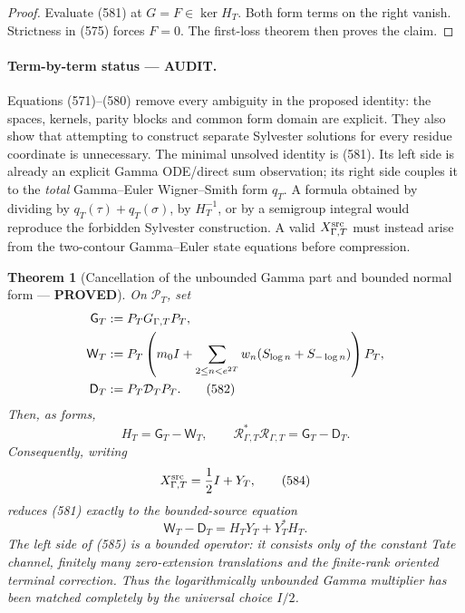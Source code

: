 \documentclass[11pt]{article}
\newtheorem{theorem}{Theorem}
\newcommand{\PROVED}{\textcolor{green!45!black}{\textbf{PROVED}}}
\newcommand{\AUDIT}{\textcolor{orange!75!black}{\textbf{AUDIT}}}
\begin{document}
\begin{proof}
Evaluate (581) at \(G=F\in\ker H_T\).  Both form terms on the right vanish.
Strictness in (575) forces \(F=0\).  The first-loss theorem then proves the
claim.
\end{proof}

\paragraph{Term-by-term status --- \AUDIT.}
Equations (571)--(580) remove every ambiguity in the proposed identity:
the spaces, kernels, parity blocks and common form domain are explicit.
They also show that attempting to construct separate Sylvester solutions
for every residue coordinate is unnecessary.  The minimal unsolved
identity is (581).  Its left side is already an explicit Gamma ODE/direct
sum observation; its right side couples it to the \emph{total}
Gamma--Euler Wigner--Smith form \(q_T\).  A formula obtained by dividing by
\(q_T(\tau)+q_T(\sigma)\), by \(H_T^{-1}\), or by a semigroup integral
would reproduce the forbidden Sylvester construction.  A valid
\(X_{\Gamma,T}^{\rm src}\) must instead arise from the two-contour
Gamma--Euler state equations before compression.

\begin{theorem}[Cancellation of the unbounded Gamma part and bounded normal
form --- \PROVED]
On \(\mathcal P_T\), set
\begin{align}
 \mathsf G_T&:=P_TG_{\Gamma,T}P_T,\notag\\
 \mathsf W_T&:=P_T\left(m_0I+
   \sum_{2\le n<e^{2T}}w_n(S_{\log n}+S_{-\log n})\right)P_T,\notag\\
 \mathsf D_T&:=P_T\mathcal D_TP_T.                   \tag{582}
\end{align}
Then, as forms,
\begin{equation}
 H_T=\mathsf G_T-\mathsf W_T,\qquad
 \mathcal R_{\Gamma,T}^*\mathcal R_{\Gamma,T}
 =\mathsf G_T-\mathsf D_T.                           \tag{583}
\end{equation}
Consequently, writing
\begin{equation}
 X_{\Gamma,T}^{\rm src}=\frac12I+Y_T,                \tag{584}
\end{equation}
reduces (581) exactly to the bounded-source equation
\begin{equation}
 \boxed{
 \mathsf W_T-\mathsf D_T
 =H_TY_T+Y_T^*H_T.}                                  \tag{585}
\end{equation}
The left side of (585) is a bounded operator: it consists only of the
constant Tate channel, finitely many zero-extension translations and the
finite-rank oriented terminal correction.  Thus the logarithmically
unbounded Gamma multiplier has been matched completely by the universal
choice \(I/2\).
\end{theorem}
\end{document}
